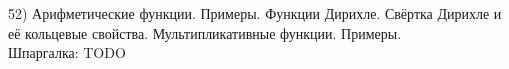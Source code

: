 52) Арифметические функции. Примеры. Функции Дирихле. Свёртка Дирихле и её кольцевые свойства. Мультипликативные функции. Примеры.\\
Шпаргалка: TODO\\
